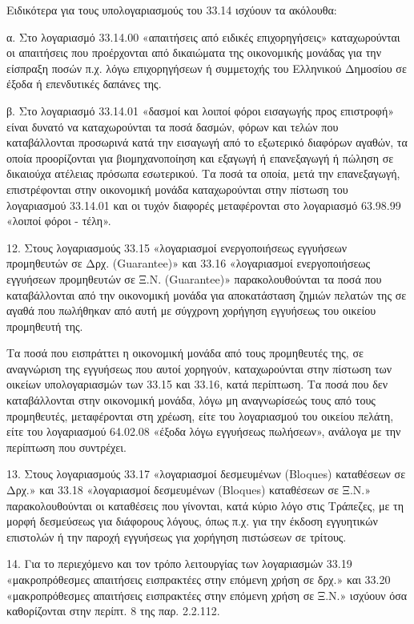 \documentclass[A4,10pt,greek]{book}
\begin{document}
Ειδικότερα για τους υπολογαριασμούς του 33.14 ισχύουν τα ακόλουθα:

α. Στο λογαριασμό 33.14.00 «απαιτήσεις από ειδικές επιχορηγήσεις» καταχωρούνται οι απαιτήσεις που προέρχονται από δικαιώματα της οικονομικής μονάδας για την είσπραξη ποσών π.χ. λόγω επιχορηγήσεων ή συμμετοχής του Ελληνικού Δημοσίου σε έξοδα ή επενδυτικές δαπάνες της.

β. Στο λογαριασμό 33.14.01 «δασμοί και λοιποί φόροι εισαγωγής προς επιστροφή» είναι δυνατό να καταχωρούνται τα ποσά δασμών, φόρων και τελών που καταβάλλονται προσωρινά κατά την εισαγωγή από το εξωτερικό διαφόρων αγαθών, τα οποία προορίζονται για βιομηχανοποίηση και εξαγωγή ή επανεξαγωγή ή πώληση σε δικαιούχα ατέλειας πρόσωπα εσωτερικού. Τα ποσά τα οποία, μετά την επανεξαγωγή, επιστρέφονται στην οικονομική μονάδα καταχωρούνται στην πίστωση του λογαριασμού 33.14.01 και οι τυχόν διαφορές μεταφέρονται στο λογαριασμό 63.98.99 «λοιποί φόροι - τέλη».

12. Στους λογαριασμούς 33.15 «λογαριασμοί ενεργοποιήσεως εγγυήσεων προμηθευτών σε Δρχ. (Guarantee)» και 33.16 «λογαριασμοί ενεργοποιήσεως εγγυήσεων προμηθευτών σε Ξ.Ν. (Guarantee)» παρακολουθούνται τα ποσά που καταβάλλονται από την οικονομική μονάδα για αποκατάσταση ζημιών πελατών της σε αγαθά που πωλήθηκαν από αυτή με σύγχρονη χορήγηση εγγυήσεως του οικείου προμηθευτή της.

Τα ποσά που εισπράττει η οικονομική μονάδα από τους προμηθευτές της, σε αναγνώριση της εγγυήσεως που αυτοί χορηγούν, καταχωρούνται στην πίστωση των οικείων υπολογαριασμών των 33.15 και 33.16, κατά περίπτωση. Τα ποσά που δεν καταβάλλονται στην οικονομική μονάδα, λόγω μη αναγνωρίσεώς τους από τους προμηθευτές, μεταφέρονται στη χρέωση, είτε του λογαριασμού του οικείου πελάτη, είτε του λογαριασμού 64.02.08 «έξοδα λόγω εγγυήσεως πωλήσεων», ανάλογα με την περίπτωση που συντρέχει.

13. Στους λογαριασμούς 33.17 «λογαριασμοί δεσμευμένων (Bloques) καταθέσεων σε Δρχ.» και 33.18 «λογαριασμοί δεσμευμένων (Bloques) καταθέσεων σε Ξ.Ν.» παρακολουθούνται οι καταθέσεις που γίνονται, κατά κύριο λόγο στις Τράπεζες, με τη μορφή δεσμεύσεως για διάφορους λόγους, όπως π.χ. για την έκδοση εγγυητικών επιστολών ή την παροχή εγγυήσεως για χορήγηση πιστώσεων σε τρίτους.

14. Για το περιεχόμενο και τον τρόπο λειτουργίας των λογαριασμών 33.19 «μακροπρόθεσμες απαιτήσεις εισπρακτέες στην επόμενη χρήση σε δρχ.» και 33.20 «μακροπρόθεσμες απαιτήσεις εισπρακτέες στην επόμενη χρήση σε Ξ.Ν.» ισχύουν όσα καθορίζονται στην περίπτ. 8 της παρ. 2.2.112.
\end{document}
